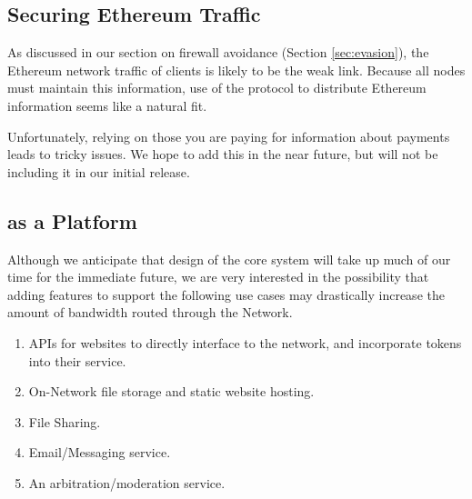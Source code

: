 \subsection{Securing Ethereum Traffic}
\label{securing-eth}

As discussed in our section on firewall avoidance (Section \ref{sec:evasion}),
the Ethereum network traffic of clients is likely to be the weak
link. Because all nodes must maintain this information, use of the
\Orchid{} protocol to distribute Ethereum information seems like a
natural fit.

Unfortunately, relying on those you are paying for information about
payments leads to tricky issues. We hope to add this in the near
future, but will not be including it in our initial release.

\subsection{\Orchid{} as a Platform}

Although we anticipate that design of the core system will take up
much of our time for the immediate future, we are very interested in
the possibility that adding features to support the following use
cases may drastically increase the amount of bandwidth routed through
the \Orchid{} Network.

\begin{enumerate}
\item APIs for websites to directly interface to the network, and
  incorporate tokens into their service.
\item On-Network file storage and static website hosting.
\item File Sharing.
\item Email/Messaging service.
\item An arbitration/moderation service.
\end{enumerate}



